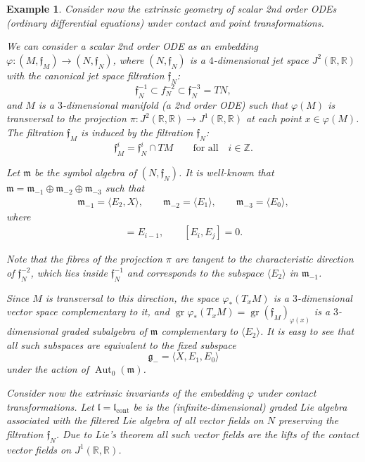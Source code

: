 \documentclass[pdftex]{sigma}%
\newcommand{\R}{\mathbb R}
\newcommand{\Z}{\mathbb Z}
\newcommand{\f}{\mathfrak f}
\newcommand{\g}{\mathfrak g}
\newcommand{\lf}{\mathfrak l}
\newcommand{\m}{\mathfrak m}
\newcommand{\Aut}{\operatorname{Aut}}
\newcommand{\gr}{\operatorname{gr}}
\newtheorem{ex}[thm]{Example}
\numberwithin{equation}{section}
\begin{document}
\begin{ex}
	Consider now the extrinsic geometry of scalar 2nd order ODEs (ordinary differential equations) under contact and point transformations.
	
	We can consider a scalar 2nd order ODE as an embedding $\varphi\colon (M,\f_M)\to (N,\f_N)$, where $(N,\f_N)$ is a $4$-dimensional jet space $J^2(\R,\R)$ with the canonical jet space filtration $\f_N$:
	\[
	\f_N^{-1} \subset f_N^{-2} \subset \f_N^{-3} = TN,
	\]
	and $M$ is a $3$-dimensional manifold (a 2nd order ODE) such that $\varphi(M)$ is transversal to the projection $\pi\colon J^2(\R,\R)\to J^1(\R,\R)$ at each point $x\in\varphi(M)$. The filtration $\f_M$ is induced by the filtration $\f_N$:
	\[
	\f_M^{i} = \f_N^{i}\cap TM\qquad\text{for all}\quad i\in \Z.
	\]
	
{\samepage	Let $\m$ be the symbol algebra of $(N,\f_N)$. It is well-known that $\m=\m_{-1}\oplus \m_{-2}\oplus \m_{-3}$ such that
	\begin{gather*}
	\m_{-1} = \langle E_2, X \rangle, \qquad
	\m_{-2} = \langle E_1 \rangle, \qquad
	\m_{-3} = \langle E_0 \rangle,
	\end{gather*}
where
	\begin{gather*}
[X,E_i] = E_{i-1},\qquad [E_i,E_j]=0.
	\end{gather*}

}

\noindent
Note that the fibres of the projection $\pi$ are tangent to the characteristic direction of $\f_{N}^{-2}$, which lies inside $\f_N^{-1}$ and corresponds to the subspace $\langle E_2 \rangle$ in $\m_{-1}$.
	
	Since $M$ is transversal to this direction, the space $\varphi_*(T_xM)$ is a $3$-dimensional vector space complementary to it, and $\gr \varphi_*(T_xM) = \gr (\f_M)_{\varphi(x)}$ is a $3$-dimensional graded subalgebra of $\m$ complementary to $\langle E_2 \rangle$. It is easy to see that all such subspaces are equivalent to the fixed subspace
	\[
	\g_{-} = \langle X,E_1, E_0 \rangle
	\]
	under the action of $\Aut_0(\m)$.
	
	Consider now the extrinsic invariants of the embedding $\varphi$ under contact transformations. Let $\lf=\lf_{\text{cont}}$ be is the (infinite-dimensional) graded Lie algebra associated with the filtered Lie algebra of all vector fields on $N$ preserving the filtration $\f_N$. Due to Lie's theorem all such vector fields are the lifts of the contact vector fields on $J^1(\R,\R)$.
	

\end{ex}
\end{document}
